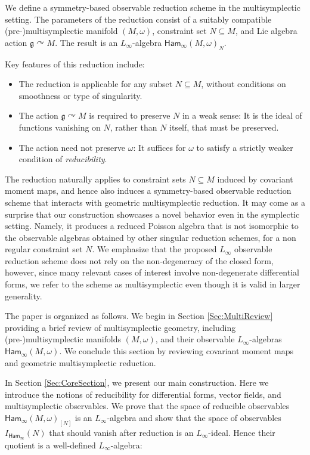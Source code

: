 \documentclass[10pt,a4paper]{amsart}
\numberwithin{equation}{section}
\newcommand{\g}{\mathfrak{g}}
\newcommand{\Ham}{\mathsf{Ham}}
\renewcommand{\subset}{\subseteq}
\begin{document}
We define a symmetry-based observable reduction scheme in the multisymplectic setting.
The parameters of the reduction consist of a suitably compatible (pre-)multisymplectic manifold $(M,\omega)$, constraint set $N\subset M$, and Lie algebra action $\g\curvearrowright M$. The result is an $L_\infty$-algebra $\Ham_\infty(M,\omega)_N$.

Key features of this reduction include:
\begin{itemize}\itemsep=0pt
	\item The reduction is applicable for any subset $N\subset M$, without conditions on smoothness or type of singularity.
	\item The action $\g\curvearrowright M$ is required to preserve $N$ in a weak sense: It is the ideal of functions vanishing on $N$, rather than $N$ itself, that must be preserved.
	\item The action need not preserve $\omega$: It suffices for $\omega$ to satisfy a strictly weaker condition of \emph{reducibility}.
\end{itemize}

The reduction naturally applies to constraint sets $N\subset M$ induced by covariant moment maps, and hence also induces a symmetry-based observable reduction scheme that interacts with geometric multisymplectic reduction.
It may come as a surprise that our construction showcases a novel behavior even in the symplectic setting. Namely, it produces a reduced Poisson algebra that is not isomorphic to the observable algebras obtained by other singular reduction schemes, for a non regular constraint set $N$.
%
We emphasize that the proposed $L_\infty$ observable reduction scheme does not rely on the non-degeneracy of the closed form,
however, since many relevant cases of interest involve non-degenerate differential forms, we refer to the scheme as multisymplectic even though it is valid in larger generality.

The paper is organized as follows.
We begin in Section \ref{Sec:MultiReview} providing a brief review of multisymplectic geometry, including (pre-)multisymplectic manifolds $(M,\omega)$, and their observable $L_\infty$-algebras $\Ham_\infty(M,\omega)$. We conclude this section by reviewing covariant moment maps and geometric multisymplectic reduction.

In Section \ref{Sec:CoreSection}, we present our main construction. Here we introduce the notions of reducibility for differential forms, vector fields, and multisymplectic observables. We prove that the space of reducible observables ${\Ham_\infty(M,\omega)_{[N]}}$ is an $L_\infty$-algebra and show that the space of observables $I_{\Ham_\infty}(N)$ that should vanish after reduction is an $L_\infty$-ideal. Hence their quotient is a well-defined $L_\infty$-algebra:
\end{document}
